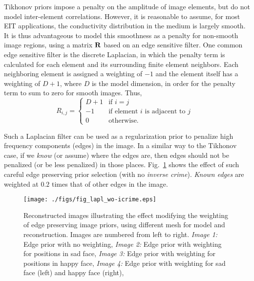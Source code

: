 \documentclass[12pt]{iopart}
\begin{document}
Tikhonov priors impose a penalty on the amplitude of image
elements, but do not model inter-element correlations. 
However, it is reasonable to assume, for most EIT applications,
the conductivity distribution in the medium is largely
smooth. It is thus advantageous to model this smoothness
as a penalty for non-smooth image regions, using a
matrix $\bf R$ based on an edge sensitive filter.
One common edge sensitive filter is the discrete Laplacian,
in which the penalty term is calculated for each element
and its surrounding finite element neighbors. Each
neighboring element is assigned a weighting of $-1$ and the element itself
has a weighting of $D+1$, where $D$ is the model dimension,
in order for the penalty term to sum to zero for smooth
images. Thus,
\begin{equation}
R_{i,j} =   \left\{ 
   \begin{array}{ll}
      D+1    & \mbox{if $i=j$ } \\
      -1     & \mbox{if element $i$ is adjacent to $j$ } \\
      0      & \mbox{otherwise.}
   \end{array}
             \right.
\end{equation}


Such a Laplacian filter can be used as a regularization prior
to penalize high frequency components (edges) in the image.
In a similar way to the Tikhonov case, 
if we {\em know} (or assume) where the edges are,
then edges should not be penalized (or be less penalized) in
those places. Fig.~\ref{fig:laplprior}
shows the effect of such careful
edge preserving prior selection (with no {\em inverse crime}).
{\em Known edges} are weighted at $0.2$ times that of other
edges in the image.

%
%
\begin{figure}[th]
\begin{flushright}
\texttt{[image: ./figs/fig\_lapl\_wo-icrime.eps]}
\caption{\small 
Reconstructed images illustrating the effect modifying the
weighting of edge preserving image priors,
using different mesh for model and reconstruction.
Images are numbered from left to right.
{\em Image 1:} Edge prior with no weighting,
{\em Image 2:} Edge prior with weighting for positions in sad face,
{\em Image 3:} Edge prior with weighting for positions in happy face,
{\em Image 4:} Edge prior with weighting for sad face (left) and
happy face (right),
 }
 \label{fig:laplprior}
\end{flushright}
\end{figure}
\end{document}
